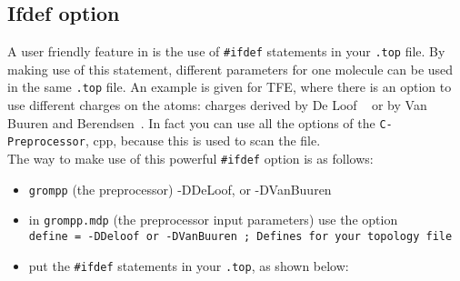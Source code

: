 \subsection{Ifdef option}
\label{subsec:ifdef}
A user friendly feature in {\gromacs} is the use of {\tt \#ifdef}
statements in your {\tt *.top} file. By making use of this
statement, different parameters for one molecule can be used in the
same {\tt *.top} file. An example is given for TFE,
where there is an option to use different charges on the atoms:
charges derived by De Loof {\etal}~\cite{Loof92} or by Van Buuren and
Berendsen~\cite{Buuren93a}. In fact you can use all the options of the
{\tt C-Preprocessor}, cpp, because this is used to scan the file.\\
The way to make use of this powerful {\tt \#ifdef} option is as follows:
\begin{itemize}
\item {\tt grompp} (the {\gromacs} preprocessor) -DDeLoof, or -DVanBuuren
\item in {\tt grompp.mdp} (the {\gromacs} preprocessor input
      parameters)  use the option \\
      {\tt define   =  -DDeloof or -DVanBuuren  
      ; Defines for your topology file}
\item put the {\tt \#ifdef} statements in your {\tt *.top}, as
      shown below: 
\end{itemize}
